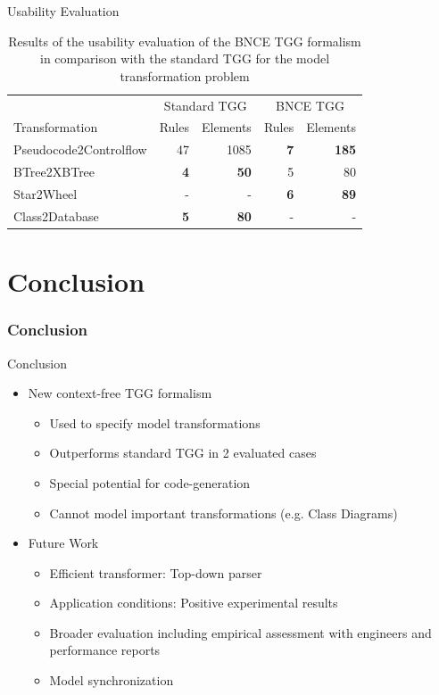 \documentclass[usenames,dvipsnames]{beamer}
\begin{document}
	\begin{frame}{Usability Evaluation}
		\footnotesize 
		\begin{table}[h]
			\centering
			\begin{tabular}{l r r r r }
				\hline
				& \multicolumn{2}{c}{Standard TGG} & \multicolumn{2}{c}{BNCE TGG}\\
				Transformation 			& Rules & Elements 	& Rules & Elements\\
				\hline
				Pseudocode2Controlflow	& 47			& 1085	& \textbf{7}	& \textbf{185} \\
				BTree2XBTree			& \textbf{4}	& \textbf{50}	& 5		& 80 \\
				Star2Wheel				& -				& -		& \textbf{6}	& \textbf{89} \\
				Class2Database			& \textbf{5}	& \textbf{80}	& - 	& -  \\
				\hline
			\end{tabular}
			\caption{Results of the usability evaluation of the BNCE TGG formalism in comparison with the standard TGG for the model transformation problem}
		\end{table}
	\end{frame}
	
	\section{Conclusion}
	\begin{frame}
		\frametitle{Conclusion}
	\end{frame}
	
	\begin{frame}{Conclusion}
		\begin{itemize}
			\item New context-free TGG formalism
			\begin{itemize}
				\item Used to specify model transformations
				\item Outperforms standard TGG in 2 evaluated cases
				\item Special potential for code-generation
				\item Cannot model important transformations (e.g. Class Diagrams)
			\end{itemize}
			\pause
			\item Future Work
			\begin{itemize}
				\item Efficient transformer: Top-down parser
				\item Application conditions: Positive experimental results
				\item Broader evaluation including empirical assessment with engineers and performance reports
				\item Model synchronization
			\end{itemize}
		\end{itemize}
	\end{frame}
	
\end{document}
